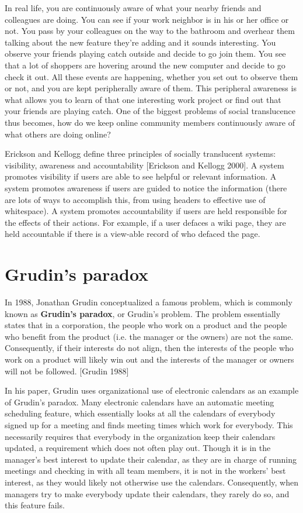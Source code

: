 \documentclass[class=book, crop=false]{standalone}
\providecommand{\keyterm}[1]{\textbf{#1}\marginnote{\scriptsize \textbf{#1}}}
\begin{document}
In real life, you are continuously aware of what your nearby friends and colleagues are doing. You can see if your work neighbor is in his or her office or not. You pass by your colleagues on the way to the bathroom and overhear them talking about the new feature they're adding and it sounds interesting. You observe your friends playing catch outside and decide to go join them. You see that a lot of shoppers are hovering around the new computer and decide to go check it out. All these events are happening, whether you set out to observe them or not, and you are kept peripherally aware of them. This peripheral awareness is what allows you to learn of that one interesting work project or find out that your friends are playing catch. One of the biggest problems of social translucence thus becomes, how do we keep online community members continuously aware of what others are doing online?

Erickson and Kellogg define three principles of socially translucent systems: visibility, awareness and accountability [Erickson and Kellogg 2000]. A system promotes visibility if users are able to see helpful or relevant information. A system promotes awareness if users are guided to notice the information (there are lots of ways to accomplish this, from using headers to effective use of whitespace). A system promotes accountability if users are held responsible for the effects of their actions. For example, if a user defaces a wiki page, they are held accountable if there is a view-able record of who defaced the page.

\section{Grudin's paradox}

In 1988, Jonathan Grudin conceptualized a famous problem, which is commonly known as \keyterm{Grudin's paradox}, or Grudin's problem. The problem essentially states that in a corporation, the people who work on a product and the people who benefit from the product (i.e. the manager or the owners) are not the same. Consequently, if their interests do not align, then the interests of the people who work on a product will likely win out and the interests of the manager or owners will not be followed. [Grudin 1988]

In his paper, Grudin uses organizational use of electronic calendars as an example of Grudin's paradox. Many electronic calendars have an automatic meeting scheduling feature, which essentially looks at all the calendars of everybody signed up for a meeting and finds meeting times which work for everybody. This necessarily requires that everybody in the organization keep their calendars updated, a requirement which does not often play out. Though it is in the manager's best interest to update their calendar, as they are in charge of running meetings and checking in with all team members, it is not in the workers' best interest, as they would likely not otherwise use the calendars. Consequently, when managers try to make everybody update their calendars, they rarely do so, and this feature fails.
\end{document}
